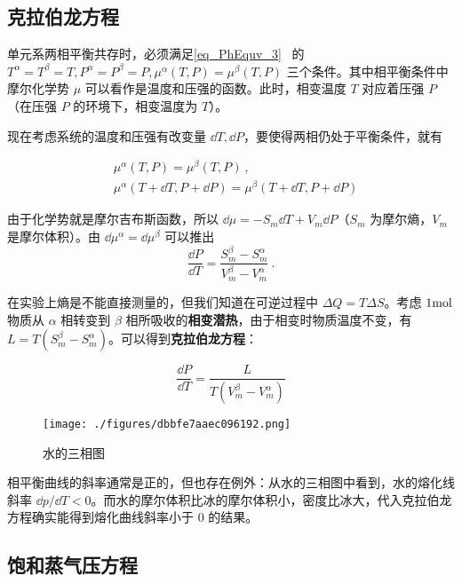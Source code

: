 
\begin{issues}
\issueDraft
\end{issues}


\subsection{克拉伯龙方程}
单元系两相平衡共存时，必须满足\autoref{eq_PhEquv_3}~ 的 $T^\alpha=T^\beta=T,P^\alpha=P^\beta=P,\mu^\alpha(T,P)=\mu^\beta(T,P)$ 三个条件。其中相平衡条件中摩尔化学势 $\mu$ 可以看作是温度和压强的函数。此时，相变温度 $T$ 对应着压强 $P$（在压强 $P$ 的环境下，相变温度为 $T$）。

现在考虑系统的温度和压强有改变量 $\dd T,\dd P$，要使得两相仍处于平衡条件，就有

\begin{align}
&\mu^\alpha(T,P)=\mu^\beta(T,P)~,\\
&\mu^\alpha(T+\dd T,P+\dd P)=\mu^\beta(T+\dd T,P+\dd P)
\end{align}

由于化学势就是摩尔吉布斯函数，所以 $\dd\mu=-S_m\dd T+V_m\dd P$（$S_m$ 为摩尔熵，$V_m$ 是摩尔体积）。由 $\dd \mu^\alpha=\dd \mu^\beta$ 可以推出
\begin{equation}
\frac{\dd P}{\dd T}=\frac{S^\beta_m-S^\alpha_m}{V^\beta_m-V^\alpha_m}~.
\end{equation}

在实验上熵是不能直接测量的，但我们知道在可逆过程中 $\Delta Q=T\Delta S$。考虑 $1\rm mol$ 物质从 $\alpha$ 相转变到 $\beta$ 相所吸收的\textbf{相变潜热}，由于相变时物质温度不变，有 $L=T(S_m^\beta-S_m^\alpha)$。可以得到\textbf{克拉伯龙方程}：

\begin{equation}\label{eq_Clapey_1}
\frac{\dd P}{\dd T}=\frac{L}{T(V^\beta_m-V^\alpha_m)}
\end{equation}
\begin{figure}[ht]
\centering
\texttt{[image: ./figures/dbbfe7aaec096192.png]}
\caption{水的三相图} \label{fig_Clapey_1}
\end{figure}

相平衡曲线的斜率通常是正的，但也存在例外：从水的三相图中看到，水的熔化线斜率 $\dd p/\dd T<0$。而水的摩尔体积比冰的摩尔体积小，密度比冰大，代入克拉伯龙方程确实能得到熔化曲线斜率小于 $0$ 的结果。

\subsection{饱和蒸气压方程}


